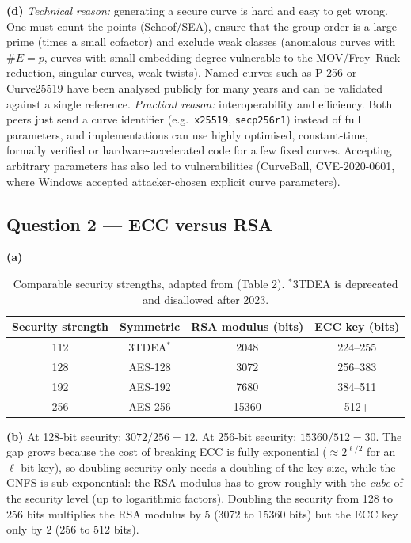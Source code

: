 \documentclass[11pt,a4paper]{article}
\begin{document}
\textbf{(d)} \emph{Technical reason:} generating a secure curve is hard and easy to get wrong. One
must count the points (Schoof/SEA), ensure that the group order is a large prime (times a small cofactor)
and exclude weak classes (anomalous curves with $\#E=p$, curves with small embedding degree
vulnerable to the MOV/Frey--R\"uck reduction, singular curves, weak twists). Named curves such as P-256
or Curve25519 \cite{sp800186,rfc7748} have been analysed publicly for many years and can be validated against a single
reference. \emph{Practical reason:} interoperability and efficiency. Both peers just send a curve
identifier (e.g.\ \texttt{x25519}, \texttt{secp256r1}) instead of full parameters, and implementations
can use highly optimised, constant-time, formally verified or hardware-accelerated code for a few fixed
curves. Accepting arbitrary parameters has also led to vulnerabilities (CurveBall, CVE-2020-0601,
where Windows accepted attacker-chosen explicit curve parameters).

\subsection*{Question 2 --- ECC versus RSA}
\begin{table}[H]
\textbf{(a)}\par\smallskip
\centering\small
\begin{tabular}{@{}cccc@{}}
\toprule
Security strength & Symmetric & RSA modulus (bits) & ECC key (bits) \\
\midrule
112 & 3TDEA$^{*}$ & 2048 & 224--255 \\
128 & AES-128 & 3072 & 256--383 \\
192 & AES-192 & 7680 & 384--511 \\
256 & AES-256 & 15360 & 512+ \\
\bottomrule
\end{tabular}
\caption{Comparable security strengths, adapted from \cite{nist80057} (Table 2). $^{*}$3TDEA is
deprecated and disallowed after 2023.}
\end{table}

\textbf{(b)} At 128-bit security: $3072/256 = 12$. At 256-bit security: $15360/512 = 30$.
The gap grows because the cost of breaking ECC is fully exponential ($\approx 2^{\ell/2}$ for an
$\ell$-bit key), so doubling security only needs a doubling of the key size, while the GNFS is
sub-exponential: the RSA modulus has to grow roughly with the \emph{cube} of the security level
(up to logarithmic factors). Doubling the security from 128 to 256 bits multiplies the RSA modulus by $5$
(3072 to 15360 bits) but the ECC key only by $2$ (256 to 512 bits).
\end{document}
